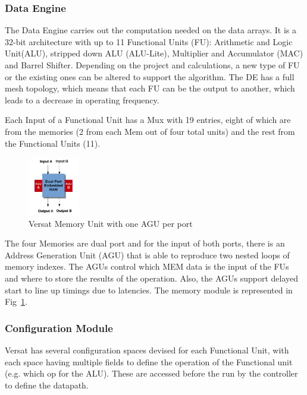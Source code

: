 \documentclass[conference]{IEEEtran}
\begin{document}
\subsubsection{Data Engine}


The Data Engine carries out the computation needed on the data arrays. It is a 32-bit architecture with up to 11 Functional Units (FU):
 Arithmetic and Logic Unit(ALU), stripped down ALU (ALU-Lite),
 Multiplier and Accumulator (MAC) and Barrel Shifter.
 Depending on the project and calculations, a new type of FU or the existing ones can be altered to support the algorithm.
 The DE has a full mesh topology, which means that each FU can be the output to another, which leads to a decrease in operating frequency.

 Each Input of a Functional Unit has a Mux with 19 entries, eight of which are from the memories (2 from each Mem out of four total units) and the rest from the Functional Units (11).

 \begin{figure}[!htbp]
    \centering
    \includegraphics[width=0.2\textwidth]{Figures/fu2.pdf}
    \caption{Versat Memory Unit with one AGU per port~\cite{lopes:Versat}}
    \label{figure:FU}
\end{figure} 


 The four Memories are dual port and for the input of both ports, 
 there is an Address Generation Unit (AGU) that is able to 
 reproduce two nested loops of memory indexes.
 The AGUs control which MEM data is the input of the FUs and where
 to store the results of the operation. Also, the AGUs support delayed start to line up timings
due to latencies. The memory module is represented in Fig~\ref{figure:FU}.

\subsubsection{Configuration Module}
Versat has several configuration spaces devised for each Functional Unit,
with each space having multiple fields to define the operation of the Functional unit (e.g. which op for the ALU).
These are accessed before the run by the controller to define the datapath.
\end{document}

